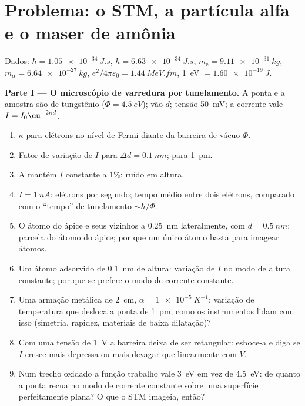 \section{Problema: o STM, a partícula alfa e o maser de amônia}

\begin{problem}\label{pb:b2:potential-wells-tunneling:1}
Dados: $\hbar = \qty{1.05e-34}{J.s}$, $h = \qty{6.63e-34}{J.s}$, $m_{\text{e}} =
\qty{9.11e-31}{kg}$, $m_\alpha = \qty{6.64e-27}{kg}$, $e^2/4\pi\varepsilon_0 =
\qty{1.44}{MeV.fm}$, \qty{1}{eV} $= \qty{1.60e-19}{J}$.

\textbf{Parte I --- O microscópio de varredura por tunelamento.}
A ponta e a amostra são de tungstênio ($\Phi = \qty{4.5}{eV}$); vão $d$; tensão
\qty{50}{mV}; a corrente vale $I = I_0\eu^{-2\kappa d}$.
\begin{enumerate}
  \item $\kappa$ para elétrons no nível de Fermi diante da barreira
        de vácuo $\Phi$.
  \item Fator de variação de $I$ para $\Delta d = \qty{0.1}{nm}$; para
        \qty{1}{pm}.
  \item A  mantém $I$ constante a $1\%$: ruído em altura.
  \item $I = \qty{1}{nA}$: elétrons por segundo; tempo médio entre dois
        elétrons, comparado com o ``tempo'' de tunelamento $\sim\hbar/\Phi$.
  \item O átomo do ápice e seus vizinhos a \qty{0.25}{nm} lateralmente,
        com $d = \qty{0.5}{nm}$: parcela do átomo do ápice; por que um único átomo
        basta para imagear átomos.
  \item Um átomo adsorvido de \qty{0.1}{nm} de altura: variação de $I$ no
        modo de altura constante; por que se prefere o modo de corrente constante.
  \item Uma armação metálica de \qty{2}{cm}, $\alpha = \qty{1e-5}{K^{-1}}$: variação de
        temperatura que desloca a ponta de \qty{1}{pm}; como os instrumentos
        lidam com isso (simetria, rapidez, materiais de baixa dilatação)?
  \item Com uma tensão de \qty{1}{V} a barreira deixa de ser retangular:
        esboce-a e diga se $I$ cresce mais depressa ou mais devagar que
        linearmente com $V$.
  \item Num trecho oxidado a função trabalho vale \qty{3}{eV} em vez
        de \qty{4.5}{eV}: de quanto a ponta recua no
        modo de corrente constante sobre uma superfície perfeitamente plana? O que o
        STM imageia, então?
\end{enumerate}


\end{problem}
